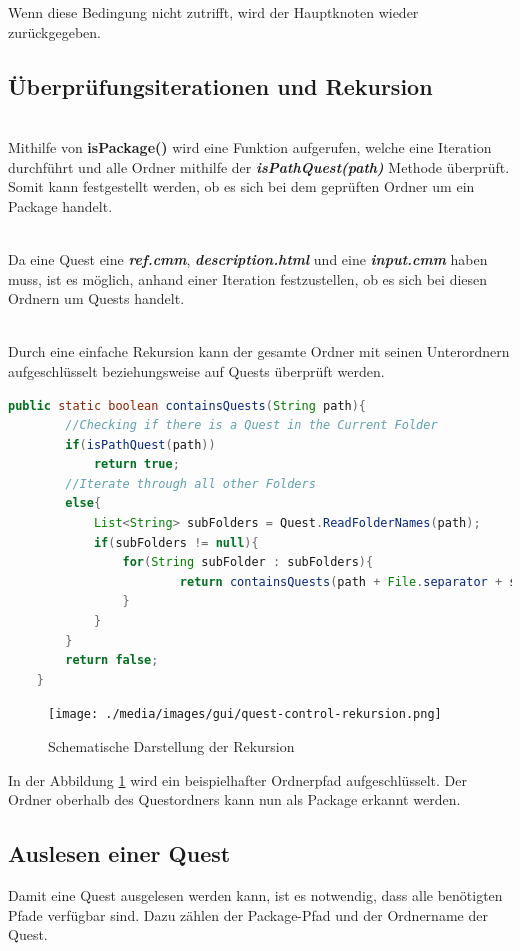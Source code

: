Wenn diese Bedingung nicht zutrifft, wird der Hauptknoten wieder zurückgegeben.

\subsection{Überprüfungsiterationen und Rekursion}
\\
Mithilfe von \textbf{isPackage()} wird eine Funktion aufgerufen, welche eine Iteration durchführt und alle Ordner mithilfe der \textit{\textbf{isPathQuest(path)}} Methode überprüft. Somit kann festgestellt werden, ob es sich bei dem geprüften Ordner um ein Package handelt.

\\
Da eine Quest eine \textit{\textbf{ref.cmm}}, \textit{\textbf{description.html}} und eine \textit{\textbf{input.cmm}} haben muss, ist es möglich, anhand einer Iteration festzustellen, ob es sich bei diesen Ordnern um Quests handelt.

\\
Durch eine einfache Rekursion kann der gesamte Ordner mit seinen Unterordnern aufgeschlüsselt beziehungsweise auf Quests überprüft werden.

\begin{lstlisting}[language=JAVA]
	public static boolean containsQuests(String path){
		//Checking if there is a Quest in the Current Folder
		if(isPathQuest(path))
			return true;
		//Iterate through all other Folders
		else{
			List<String> subFolders = Quest.ReadFolderNames(path);
			if(subFolders != null){
				for(String subFolder : subFolders){
						return containsQuests(path + File.separator + subFolder);
				}
			}
		}
		return false;
	}
\end{lstlisting}



\begin{figure}[h] 
  \centering
     \texttt{[image: ./media/images/gui/quest-control-rekursion.png]}
  \caption{Schematische Darstellung der Rekursion}
  \label{fig:JTree_Control_Rekursion}
\end{figure}

In der Abbildung \ref{fig:JTree_Control_Rekursion} wird ein beispielhafter Ordnerpfad aufgeschlüsselt. Der Ordner oberhalb des Questordners kann nun als Package erkannt werden.

\subsection{Auslesen einer Quest}
Damit eine Quest ausgelesen werden kann, ist es notwendig, dass alle benötigten Pfade verfügbar sind. Dazu zählen der Package-Pfad und der Ordnername der Quest.

